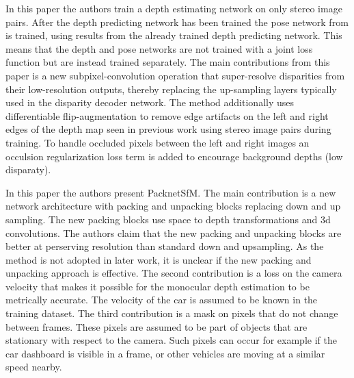 
In this paper\cite{superdepth} the authors train a depth estimating network on only stereo image pairs. After the depth predicting network has been trained the pose network from \cite{sfmlearner} is trained, using results from the already trained depth predicting network. This means that the depth and pose networks are not trained with a joint loss function but are instead trained separately. The main contributions from this paper is a new subpixel-convolution operation that super-resolve disparities from their low-resolution outputs, thereby replacing the up-sampling layers typically used in the disparity decoder network. The method additionally uses differentiable flip-augmentation to remove edge artifacts on the left and right edges of the depth map seen in previous work using stereo image pairs during training. To handle occluded pixels between the left and right images an occulsion regularization loss term is added to encourage background depths (low disparaty).


In this paper\cite{packnet} the authors present PacknetSfM. The main contribution is a new network architecture with packing and unpacking blocks replacing down and up sampling. The new packing blocks use space to depth transformations and 3d convolutions. The authors claim that the new packing and unpacking blocks are better at perserving resolution than standard down and upsampling. As the method is not adopted in later work, it is unclear if the new packing and unpacking approach is effective. The second contribution is a loss on the camera velocity that makes it possible for the monocular depth estimation to be metrically accurate. The velocity of the car is assumed to be known in the training dataset. The third contribution is a mask on pixels that do not change between frames. These pixels are assumed to be part of objects that are stationary with respect to the camera. Such pixels can occur for example if the car dashboard is visible in a frame, or other vehicles are moving at a similar speed nearby.


